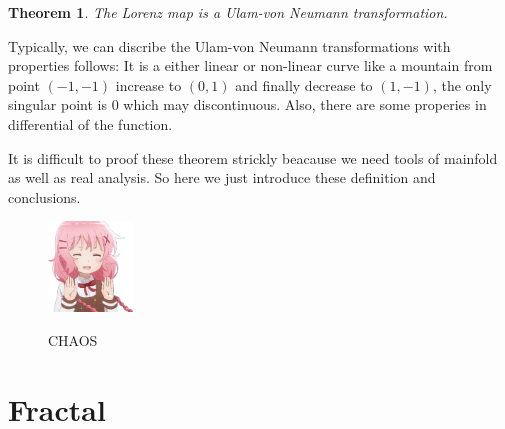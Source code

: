\documentclass[12pt]{article}
\theoremstyle{plain}
\newtheorem{theorem}{\textbf{Theorem}}[section]
\begin{document}
\begin{theorem} The Lorenz map is a Ulam-von Neumann transformation.
\end{theorem}

Typically, we can discribe the Ulam-von Neumann transformations with properties follows: It is a either linear or non-linear curve like a mountain from point $(-1, -1)$ increase to $(0, 1)$ and finally decrease to $(1, -1)$, the only singular point is $0$ which may discontinuous. Also, there are some properies in differential of the function.

It is difficult to proof these theorem strickly beacause we need tools of mainfold as well as real analysis. So here we just introduce these definition and conclusions.



\begin{figure}[H]
\begin{center}
\includegraphics[width=0.2\textwidth]{figure/CHAOS_1.png} \\
\caption{CHAOS}
\end{center}
\end{figure}




\newpage
\section{Fractal}
\end{document}
